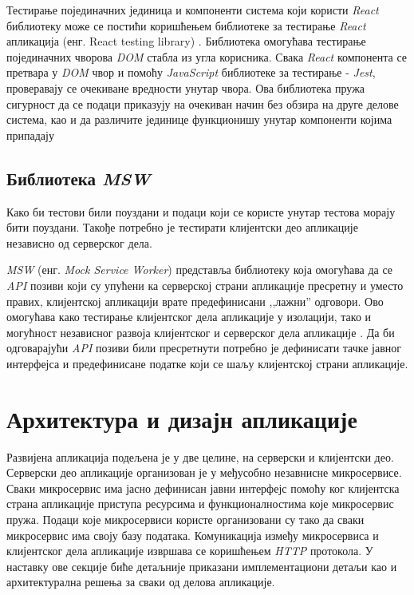 \documentclass[12pt,oneside]{memoir}
\begin{document}
Тестирање појединачних јединица и компоненти система који користи \textit{React} библиотеку може се постићи коришћењем библиотеке за тестирање \textit{React} апликација (енг. React testing library) \cite{rtl}. Библиотека омогућава тестирање појединачних чворова \textit{DOM} стабла из угла корисника. Свака \textit{React} компонента се претвара у \textit{DOM} чвор и помоћу \textit{JavaScript} библиотеке за тестирање - \textit{Jest}, проверавају се очекиване вредности унутар чвора. Ова библиотека пружа сигурност да се подаци приказују на очекиван начин без обзира на друге делове система, као и да различите јединице функционишу унутар компоненти којима припадају \cite{rtl,jest}



\subsection{Библиотека \textit{MSW}}

Како би тестови били поуздани и подаци који се користе унутар тестова морају бити поуздани. Такође потребно је тестирати клијентски део апликације независно од серверског дела. 

\textit{MSW} (енг. \textit{Mock Service Worker}) представља библиотеку која омогућава да се \textit{API} позиви који су упућени ка серверској страни апликације пресретну и уместо правих, клијентској апликацији врате предефинисани ,,лажни” одговори. Ово омогућава како тестирање клијентског дела апликације у изолацији, тако и могућност независног развоја клијентског и серверског дела апликације \cite{msw}. Да би одговарајући \textit{API} позиви били пресретнути потребно је дефинисати тачке јавног интерфејса и предефинисане податке који се шаљу клијентској страни апликације.



\section{Архитектура и дизајн апликације}

Развијена апликација подељена је у две целине, на серверски и клијентски део. Серверски део апликације организован је у међусобно незавнисне микросервисе. Сваки микросервис има јасно дефинисан јавни интерфејс помоћу ког клијентска страна апликације приступа ресурсима и функционалностима које микросервис пружа. Подаци које микросервиси користе организовани су тако да сваки микросервис има своју базу података. Комуникација између микросервиса и клијентског дела апликације извршава се коришћењем \textit{HTTP} протокола. У наставку ове секције биће детаљније приказани имплементациони детаљи као и архитектурална решења за сваки од делова апликације.
\end{document}

